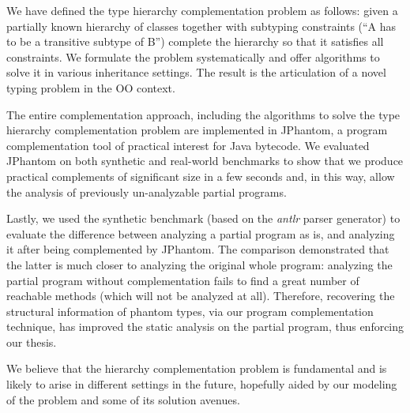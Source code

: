 We have defined the type hierarchy complementation problem as follows:
given a partially known hierarchy of classes together with subtyping
constraints (``A has to be a transitive subtype of B'') complete the
hierarchy so that it satisfies all constraints. We formulate the
problem systematically and offer algorithms to solve it in various
inheritance settings. The result is the articulation of a novel typing
problem in the OO context.

The entire complementation approach, including the algorithms to solve
the type hierarchy complementation problem are implemented in
JPhantom, a program complementation tool of practical interest for
Java bytecode.
%
We evaluated JPhantom on both synthetic and real-world benchmarks to
show that we produce practical complements of significant size in a
few seconds and, in this way, allow the analysis of previously
un-analyzable partial programs.

Lastly, we used the synthetic benchmark (based on the \emph{antlr}
parser generator) to evaluate the difference between analyzing a
partial program as is, and analyzing it after being complemented by
JPhantom. The comparison demonstrated that the latter is much closer
to analyzing the original whole program: analyzing the partial program
without complementation fails to find a great number of reachable
methods (which will not be analyzed at all). Therefore, recovering the
structural information of phantom types, via our program
complementation technique, has improved the static analysis on the
partial program, thus enforcing our thesis.

We believe that the hierarchy complementation problem is fundamental
and is likely to arise in different settings in the future, hopefully
aided by our modeling of the problem and some of its solution avenues.





